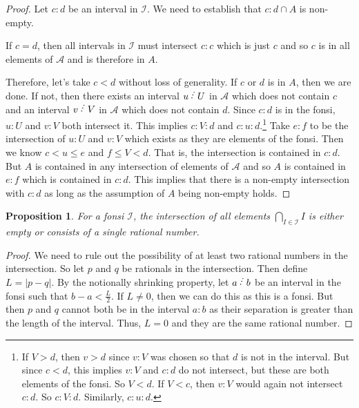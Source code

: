 \documentclass[12pt]{article}
\newtheorem{proposition}{Proposition}[subsection]
\begin{document}
\begin{proof}
Let $c:d$ be an interval in $\mathcal{I}$. We need to establish that $c:d \cap A$ is non-empty. 

If $c=d$, then all intervals in $\mathcal{I}$ must intersect $c:c$ which is just $c$ and so $c$ is in all elements of $\mathcal{A}$ and is therefore in $A$.

Therefore, let's take $c < d$ without loss of generality. If $c$ or $d$ is in $A$, then we are done. If not, then there exists an interval $u\lte U$ in $\mathcal{A}$ which does not contain $c$ and an interval $v \lte V$ in $\mathcal{A}$ which does not contain $d$. Since $c:d$ is in the fonsi, $u:U$ and $v:V$ both intersect it. This implies $c : V : d$ and $c:u:d$.\footnote{ If $V > d$, then $v>d$ since $v:V$ was chosen so that $d$ is not in the interval. But since $c<d$, this implies $v:V$ and $c:d$ do not intersect, but these are both elements of the fonsi. So $V <d$. If $V < c$, then $v:V$ would again not intersect $c:d$. So $c:V:d$. Similarly, $c:u:d$. } Take $e:f$ to be the intersection of $u:U$ and $v:V$ which exists as they are elements of the fonsi. Then we know $c < u \leq e$ and $f \leq V < d$. That is, the intersection is contained in $c:d$. But $A$ is contained in any intersection of elements of $\mathcal{A}$ and so $A$ is contained in $e:f$ which is contained in $c:d$. This implies that there is a non-empty intersection with $c:d$ as long as the assumption of  $A$ being non-empty holds. 

\end{proof}

\begin{proposition}\label{pr:fon-unique-inter}
    For a fonsi $\mathcal I$, the intersection of all elements $\bigcap_{I \in \mathcal{I}} I$ is either empty or consists of a single rational number.
\end{proposition}

\begin{proof}
    We need to rule out the possibility of at least two rational numbers in the intersection. So let $p$ and $q$ be rationals in the intersection. Then define $L = |p - q|$. By the notionally shrinking property, let $a\lte b$ be an interval in the fonsi such that $b-a < \frac{L}{2}$. If $L \neq 0$, then we can do this as this is a fonsi. But then $p$ and $q$ cannot both be in the interval $a:b$ as their separation is greater than the length of the interval. Thus, $L=0$ and they are the same rational number. 
\end{proof}
\end{document}
